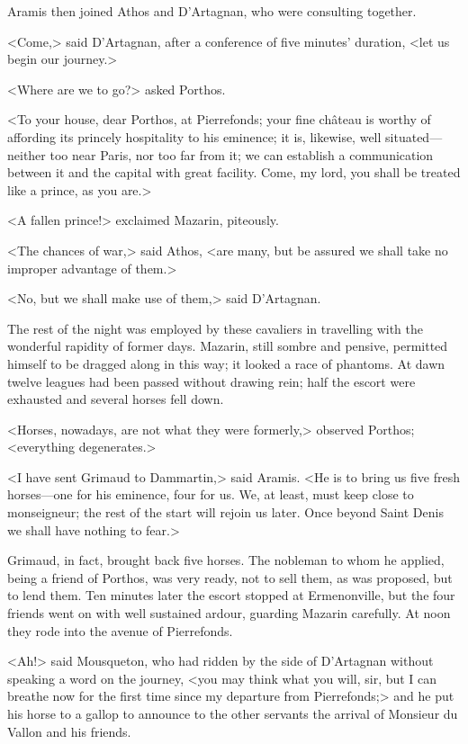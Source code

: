 Aramis then joined Athos and D'Artagnan, who were consulting together.

<Come,> said D'Artagnan, after a conference of five minutes' duration, <let us begin our journey.>

<Where are we to go?> asked Porthos.

<To your house, dear Porthos, at Pierrefonds; your fine château is worthy of affording its princely hospitality to his eminence; it is, likewise, well situated—neither too near Paris, nor too far from it; we can establish a communication between it and the capital with great facility. Come, my lord, you shall be treated like a prince, as you are.>

<A fallen prince!> exclaimed Mazarin, piteously.

<The chances of war,> said Athos, <are many, but be assured we shall take no improper advantage of them.>

<No, but we shall make use of them,> said D'Artagnan.

The rest of the night was employed by these cavaliers in travelling with the wonderful rapidity of former days. Mazarin, still sombre and pensive, permitted himself to be dragged along in this way; it looked a race of phantoms. At dawn twelve leagues had been passed without drawing rein; half the escort were exhausted and several horses fell down.

<Horses, nowadays, are not what they were formerly,> observed Porthos; <everything degenerates.>

<I have sent Grimaud to Dammartin,> said Aramis. <He is to bring us five fresh horses—one for his eminence, four for us. We, at least, must keep close to monseigneur; the rest of the start will rejoin us later. Once beyond Saint Denis we shall have nothing to fear.>

Grimaud, in fact, brought back five horses. The nobleman to whom he applied, being a friend of Porthos, was very ready, not to sell them, as was proposed, but to lend them. Ten minutes later the escort stopped at Ermenonville, but the four friends went on with well sustained ardour, guarding Mazarin carefully. At noon they rode into the avenue of Pierrefonds.

<Ah!> said Mousqueton, who had ridden by the side of D'Artagnan without speaking a word on the journey, <you may think what you will, sir, but I can breathe now for the first time since my departure from Pierrefonds;> and he put his horse to a gallop to announce to the other servants the arrival of Monsieur du Vallon and his friends.

